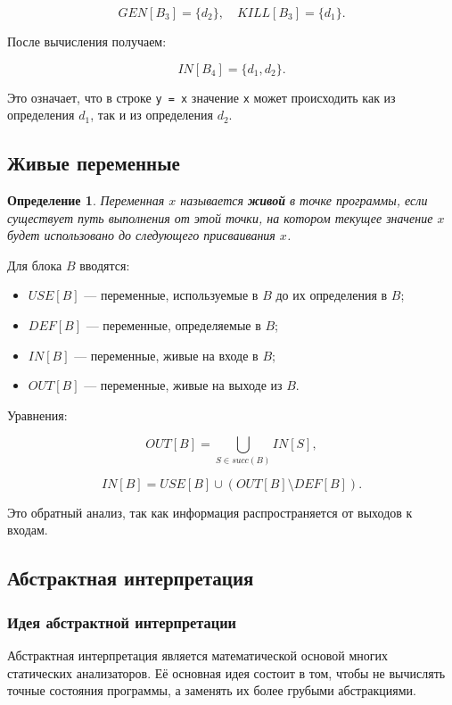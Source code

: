 \documentclass[12pt,a4paper]{article}
\newtheorem{definition}{Определение}
\begin{document}
\[
GEN[B_3]=\{d_2\}, \quad KILL[B_3]=\{d_1\}.
\]

После вычисления получаем:

\[
IN[B_4] = \{d_1,d_2\}.
\]

Это означает, что в строке \texttt{y = x} значение \texttt{x} может происходить как из определения $d_1$, так и из определения $d_2$.

\subsection{Живые переменные}

\begin{definition}
Переменная $x$ называется \textbf{живой} в точке программы, если существует путь выполнения от этой точки, на котором текущее значение $x$ будет использовано до следующего присваивания $x$.
\end{definition}

Для блока $B$ вводятся:

\begin{itemize}
  \item $USE[B]$ --- переменные, используемые в $B$ до их определения в $B$;
  \item $DEF[B]$ --- переменные, определяемые в $B$;
  \item $IN[B]$ --- переменные, живые на входе в $B$;
  \item $OUT[B]$ --- переменные, живые на выходе из $B$.
\end{itemize}

Уравнения:

\[
OUT[B] = \bigcup_{S \in succ(B)} IN[S],
\]

\[
IN[B] = USE[B] \cup (OUT[B] \setminus DEF[B]).
\]

Это обратный анализ, так как информация распространяется от выходов к входам.

\subsection{Абстрактная интерпретация}

\subsubsection{Идея абстрактной интерпретации}

Абстрактная интерпретация является математической основой многих статических анализаторов. Её основная идея состоит в том, чтобы не вычислять точные состояния программы, а заменять их более грубыми абстракциями.
\end{document}
